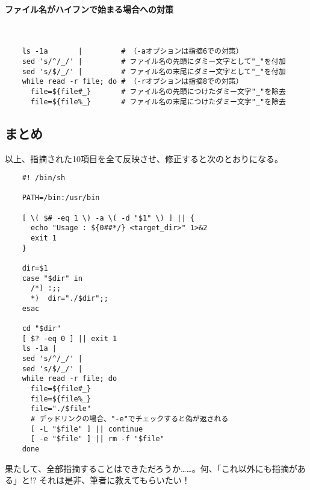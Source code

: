 \paragraph{ファイル名がハイフンで始まる場合への対策} 　\\
\begin{frameboxit}{160.0mm}
\begin{verbatim}
	ls -1a       |         # （-aオプションは指摘6での対策）
	sed 's/^/_/' |         # ファイル名の先頭にダミー文字として"_"を付加
	sed 's/$/_/' |         # ファイル名の末尾にダミー文字として"_"を付加
	while read -r file; do # （-rオプションは指摘8での対策）
	  file=${file#_}       # ファイル名の先頭につけたダミー文字"_"を除去
	  file=${file%_}       # ファイル名の末尾につけたダミー文字"_"を除去
\end{verbatim}
\end{frameboxit}

\subsection*{まとめ}

以上、指摘された10項目を全て反映させ、修正すると次のとおりになる。

\noindent
\begin{frameboxit}{160.0mm}
\begin{verbatim}
	#! /bin/sh

	PATH=/bin:/usr/bin

	[ \( $# -eq 1 \) -a \( -d "$1" \) ] || {
	  echo "Usage : ${0##*/} <target_dir>" 1>&2
	  exit 1
	}

	dir=$1
	case "$dir" in
	  /*) :;;
	  *)  dir="./$dir";;
	esac

	cd "$dir"
	[ $? -eq 0 ] || exit 1
	ls -1a |
	sed 's/^/_/' |
	sed 's/$/_/' |
	while read -r file; do
	  file=${file#_}
	  file=${file%_}
	  file="./$file"
	  # デッドリンクの場合、"-e"でチェックすると偽が返される
	  [ -L "$file" ] || continue
	  [ -e "$file" ] || rm -f "$file"
	done
\end{verbatim}
\end{frameboxit}

果たして、全部指摘することはできただろうか……。何、「これ以外にも指摘がある」と!? それは是非、筆者に教えてもらいたい！